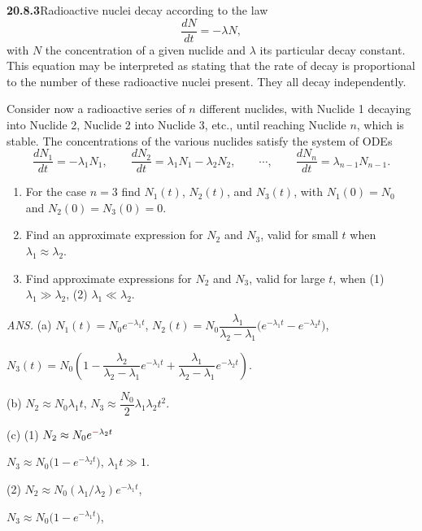 \par\bigskip
\noindent\textbf{20.8.3}\quad Radioactive nuclei decay according
to the law
\[
\frac{dN}{dt}=-\lambda N,
\]
with $N$ the concentration of a given nuclide and $\lambda$ its
particular decay constant. This equation may be interpreted as
stating that the rate of decay is proportional to the number of
these radioactive nuclei present. They all decay independently.

Consider now a radioactive series of $n$ different nuclides, with
Nuclide 1 decaying into Nuclide 2, Nuclide 2 into Nuclide 3, etc.,
until reaching Nuclide $n$, which is stable. The concentrations of
the various nuclides satisfy the system of ODEs
\[
\frac{dN_{1}}{dt}=-\lambda_{1}N_{1},\qquad
\frac{dN_{2}}{dt}=\lambda_{1}N_{1}-\lambda_{2}N_{2},\qquad
\cdots,\qquad
\frac{dN_{n}}{dt}=\lambda_{n-1}N_{n-1}.
\]
\begin{enumerate}
\item[(a)] For the case $n=3$ find $N_{1}(t)$, $N_{2}(t)$, and
$N_{3}(t)$, with $N_{1}(0)=N_{0}$ and $N_{2}(0)=N_{3}(0)=0$.
\item[(b)] Find an approximate expression for $N_{2}$ and $N_{3}$,
valid for small $t$ when $\lambda_{1}\approx\lambda_{2}$.
\item[(c)] Find approximate expressions for $N_{2}$ and $N_{3}$,
valid for large $t$, when (1) $\lambda_{1}\gg\lambda_{2}$,
(2) $\lambda_{1}\ll\lambda_{2}$.
\end{enumerate}
\par\nobreak\hfill\emph{ANS.}\enspace
(a) $N_{1}(t)=N_{0}e^{-\lambda_{1}t}$,\quad
$N_{2}(t)=N_{0}\dfrac{\lambda_{1}}{\lambda_{2}-\lambda_{1}}
\big(e^{-\lambda_{1}t}-e^{-\lambda_{2}t}\big)$,\par\nobreak\hfill
$N_{3}(t)=N_{0}\left(1-\dfrac{\lambda_{2}}{\lambda_{2}-\lambda_{1}}
e^{-\lambda_{1}t}+\dfrac{\lambda_{1}}{\lambda_{2}-\lambda_{1}}
e^{-\lambda_{2}t}\right)$.\par\nobreak\hfill
(b) $N_{2}\approx N_{0}\lambda_{1}t$,\quad
$N_{3}\approx\dfrac{N_{0}}{2}\lambda_{1}\lambda_{2}t^{2}$.
\par\nobreak\hfill
(c) (1) $N_{2}\approx N_{0}e^{\erratum{-}\lambda_{2}t}$\par
\nobreak\hfill$N_{3}\approx N_{0}\big(1-e^{-\lambda_{2}t}\big)$,
\quad$\lambda_{1}t\gg1$.\par\nobreak\hfill
(2) $N_{2}\approx N_{0}(\lambda_{1}/\lambda_{2})
e^{-\lambda_{1}t}$,\par\nobreak\hfill
$N_{3}\approx N_{0}\big(1-e^{-\lambda_{1}t}\big)$,
